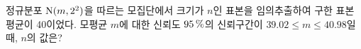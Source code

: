 정규분포 $\mathrm{N}(m{,}\mkern3mu\mathopen{}2^2)$을 따르는 모집단에서 크기가 $n$인 표본을 임의추출하여 구한 표본평균이 40이었다. 모평균 $m$에 대한 신뢰도 $95\mkern3mu \%$의 신뢰구간이 $39.02\le m\le 40.98$일 때, $n$의 값은? 
